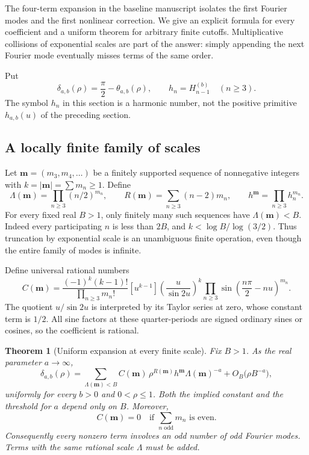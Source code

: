 \documentclass[11pt]{article}
\numberwithin{equation}{section}
\theoremstyle{plain}
\newtheorem{theorem}{Theorem}[section]
\theoremstyle{definition}
\theoremstyle{remark}
\begin{document}
The four-term expansion in the baseline manuscript isolates the first
Fourier modes and the first nonlinear correction. We give an explicit
formula for every coefficient and a uniform theorem for arbitrary finite
cutoffs. Multiplicative collisions of exponential scales are part of the
answer: simply appending the next Fourier mode eventually misses terms
of the same order.

Put
\[
 \delta_{a,b}(\rho)=\frac\pi2-\theta_{a,b}(\rho),\qquad
 h_n=H_{n-1}^{(b)}\quad(n\ge3).
\]
The symbol $h_n$ in this section is a harmonic number, not the positive
primitive $h_{a,b}(u)$ of the preceding section.

\subsection{A locally finite family of scales}

Let $\boldsymbol m=(m_3,m_4,\ldots)$ be a finitely supported sequence
of nonnegative integers with $k=|\boldsymbol m|=\sum m_n\ge1$.
Define
\begin{equation}\label{eq:scale-data}
 \Lambda(\boldsymbol m)=\prod_{n\ge3}(n/2)^{m_n},\qquad
 R(\boldsymbol m)=\sum_{n\ge3}(n-2)m_n,\qquad
 h^{\boldsymbol m}=\prod_{n\ge3}h_n^{m_n}.
\end{equation}
For every fixed real $B>1$, only finitely many such sequences have
$\Lambda(\boldsymbol m)<B$. Indeed every participating $n$ is less
than $2B$, and $k<\log B/\log(3/2)$. Thus truncation by exponential
scale is an unambiguous finite operation, even though the entire family
of modes is infinite.

Define universal rational numbers
\begin{equation}\label{eq:lagrange-coefficient}
 C(\boldsymbol m)=
 \frac{(-1)^k(k-1)!}{\prod_{n\ge3}m_n!}
 [u^{k-1}]
 \left(\frac{u}{\sin2u}\right)^k
 \prod_{n\ge3}\sin\left(\frac{n\pi}2-nu\right)^{m_n}.
\end{equation}
The quotient $u/\sin2u$ is interpreted by its Taylor series at zero,
whose constant term is $1/2$. All sine factors at these quarter-periods
are signed ordinary sines or cosines, so the coefficient is rational.

\begin{theorem}[Uniform expansion at every finite scale]
\label{thm:allorders}
Fix $B>1$. As the real parameter $a\to\infty$,
\begin{equation}\label{eq:allorder-expansion}
 \delta_{a,b}(\rho)=
 \sum_{\Lambda(\boldsymbol m)<B}
 C(\boldsymbol m)\,
 \rho^{R(\boldsymbol m)}h^{\boldsymbol m}
 \Lambda(\boldsymbol m)^{-a}
 +O_B\bigl(\rho B^{-a}\bigr),
\end{equation}
uniformly for every $b>0$ and $0<\rho\le1$. Both the implied constant
and the threshold for $a$ depend only on $B$. Moreover,
\begin{equation}\label{eq:odd-mode-selection}
 C(\boldsymbol m)=0
 \quad\text{if }\sum_{n\text{ odd}}m_n\text{ is even}.
\end{equation}
Consequently every nonzero term involves an odd number of odd Fourier
modes. Terms with the same rational scale $\Lambda$ must be added.
\end{theorem}
\end{document}
